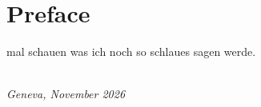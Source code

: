 \chapter{Preface}
mal schauen was ich noch so schlaues sagen werde.

\begin{flushright}
{\makeatletter\itshape
  \@author\\
  Geneva, November 2026
\makeatother}%
\end{flushright}

